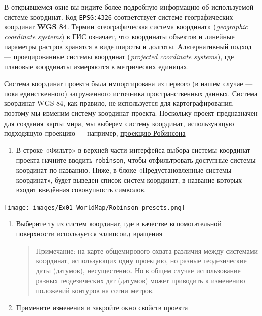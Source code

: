 \documentclass[
  12pt,
]{book}
\providecommand{\tightlist}{%
  \setlength{\itemsep}{0pt}\setlength{\parskip}{0pt}}
\begin{document}
В открывшемся окне вы видите более подробную информацию об используемой системе координат. Код \texttt{EPSG:4326} соответствует системе географических координат \textbf{WGS 84}. Термин «географическая система координат» (\emph{geographic coordinate systems}) в ГИС означает, что координаты объектов и линейные параметры растров хранятся в виде широты и долготы. Альтернативный подход --- проецированные системы координат (\emph{projected coordinate systems}), где плановые координаты измеряются в метрических единицах.

Система координат проекта была импортирована из первого (в нашем случае --- пока единственного) загруженного источника пространственных данных. Система координат WGS 84, как правило, не используется для картографирования, поэтому мы изменим систему координат проекта. Поскольку проект предназначен для создания карты мира, мы выберем систему координат, использующую подходящую проекцию --- например, \href{https://en.wikipedia.org/wiki/Robinson_projection}{проекцию Робинсона}

\begin{enumerate}
\def\labelenumi{\arabic{enumi}.}
\tightlist
\item
  В строке «Фильтр» в верхней части интерфейса выбора системы координат проекта начните вводить \texttt{robinson}, чтобы отфильтровать доступные системы координат по названию. Ниже, в блоке «Предустановленные системы координат», будет выведен список систем координат, в название которых входит введённая совокупность символов.
\end{enumerate}

\texttt{[image: images/Ex01\_WorldMap/Robinson\_presets.png]}

\begin{enumerate}
\def\labelenumi{\arabic{enumi}.}
\setcounter{enumi}{1}
\item
  Выберите ту из систем координат, где в качестве вспомогательной поверхности используется эллипсоид вращения

  \begin{quote}
  Примечание: на карте общемирового охвата различия между системами координат, использующих одну проекцию, но разные геодезические даты (датумов), несущестенно. Но в общем случае использование разных геодезических дат (датумов) может приводить к изменению положений контуров на сотни метров.
  \end{quote}
\item
  Примените изменения и закройте окно свойств проекта
\end{enumerate}
\end{document}
